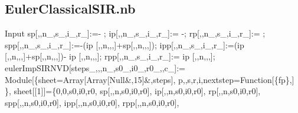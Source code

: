 \documentclass{article}
\begin{document}
\begin{appendix}
\section{EulerClassicalSIR.nb}
\begin{mmaCell}[moredefined={sp, ip, rp, spp, ipp, rpp, eulerImpSIRNVD},morepattern={n_, s_, i_, r_, n, steps_, s0_, i0_, r0_, c_, steps, fp, c, s0, i0, r0, \#},morelocal={i, s, r, sheet, p, nextstep}]{Input}
  sp[\mmaPat{\(\pmb{\beta}\)_},\mmaPat{\(\pmb{\gamma}\)_},n_,s_,i_,r_]:=- ;
  ip[\mmaPat{\(\pmb{\beta}\)_},\mmaPat{\(\pmb{\gamma}\)_},n_,s_,i_,r_]:= -\mmaPat{\(\pmb{\gamma}\)};
  rp[\mmaPat{\(\pmb{\beta}\)_},\mmaPat{\(\pmb{\gamma}\)_},n_,s_,i_,r_]:=\mmaPat{\(\pmb{\gamma}\)} ;
  spp[\mmaPat{\(\pmb{\beta}\)_},\mmaPat{\(\pmb{\gamma}\)_},n_,s_,i_,r_]:=-(ip [\mmaPat{\(\pmb{\beta}\)},\mmaPat{\(\pmb{\gamma}\)},n,,,]+sp[\mmaPat{\(\pmb{\beta}\)},\mmaPat{\(\pmb{\gamma}\)},n,,,]);
  ipp[\mmaPat{\(\pmb{\beta}\)_},\mmaPat{\(\pmb{\gamma}\)_},n_,s_,i_,r_]:=(ip [\mmaPat{\(\pmb{\beta}\)},\mmaPat{\(\pmb{\gamma}\)},n,,,]+sp[\mmaPat{\(\pmb{\beta}\)},\mmaPat{\(\pmb{\gamma}\)},n,,,])-\mmaPat{\(\pmb{\gamma}\)} ip [\mmaPat{\(\pmb{\beta}\)},\mmaPat{\(\pmb{\gamma}\)},n,,,];
  rpp[\mmaPat{\(\pmb{\beta}\)_},\mmaPat{\(\pmb{\gamma}\)_},n_,s_,i_,r_]:=\mmaPat{\(\pmb{\gamma}\)} ip [\mmaPat{\(\pmb{\beta}\)},\mmaPat{\(\pmb{\gamma}\)},n,,,];
  eulerImpSIRNVD[steps_,\mmaPat{\(\pmb{\beta}\)_},\mmaPat{\(\pmb{\gamma}\)_},n_,s0_,i0_,r0_,\mmaPat{\(\pmb{\epsilon}\)_},c_]:=
    Module[\{sheet=Array[Array[Null&,15]&,steps],
      p,\mmaLoc{\(\pmb{\iota}\)},s,r,i,nextstep=Function[\{fp\},]
    \},
    sheet[[1]]=\{0,0,s0,i0,r0,
        sp[\mmaPat{\(\pmb{\beta}\)},\mmaPat{\(\pmb{\gamma}\)},n,s0,i0,r0],
        ip[\mmaPat{\(\pmb{\beta}\)},\mmaPat{\(\pmb{\gamma}\)},n,s0,i0,r0],
        rp[\mmaPat{\(\pmb{\beta}\)},\mmaPat{\(\pmb{\gamma}\)},n,s0,i0,r0],
        spp[\mmaPat{\(\pmb{\beta}\)},\mmaPat{\(\pmb{\gamma}\)},n,s0,i0,r0],
        ipp[\mmaPat{\(\pmb{\beta}\)},\mmaPat{\(\pmb{\gamma}\)},n,s0,i0,r0],
        rpp[\mmaPat{\(\pmb{\beta}\)},\mmaPat{\(\pmb{\gamma}\)},n,s0,i0,r0],

\end{mmaCell}
\end{appendix}
\end{document}
